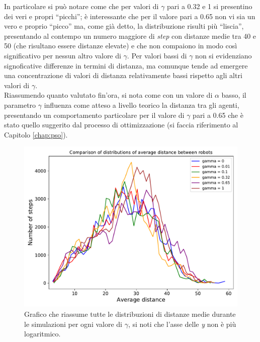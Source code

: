 In particolare si può notare come che per valori di $\gamma$ pari a 0.32 e 1 si presentino dei veri e propri “picchi”; è interessante che per il valore pari a 0.65 non vi sia un vero e proprio “picco” ma, come già detto, la distribuzione risulti più “liscia”, presentando al contempo un numero maggiore di \textit{step} con distanze medie tra 40 e 50 (che risultano essere distanze elevate) e che non compaiono in modo così significativo per nessun altro valore di $\gamma$.
Per valori bassi di $\gamma$ non si evidenziano signoficative differenze in termini di distanza, ma comunque tende ad emergere una concentrazione di valori di distanza relativamente bassi rispetto agli altri valori di $\gamma$.\\
Riassumendo quanto valutato fin'ora, si nota come con un valore di $\alpha$ basso, il parametro $\gamma$ influenza come atteso a livello teorico la distanza tra gli agenti, presentando un comportamento particolare per il valore di $\gamma$ pari a 0.65 che è stato quello suggerito dal processo di ottimizzazione (si faccia riferimento al Capitolo \ref{chap:pso}).
\begin{figure}
	\centering
	\includegraphics[width=0.9\linewidth]{images/gamma_results/low_alpha/comparison}
	\caption{Grafico che riassume tutte le distribuzioni di distanze medie durante le simulazioni per ogni valore di $\gamma$, si noti che l'asse delle \textit{y} non è più logaritmico.}
	\label{fig:gammaComparison}
\end{figure}

